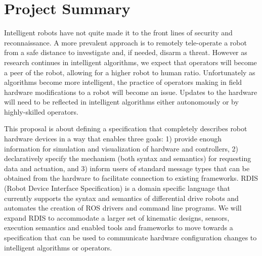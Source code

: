 
\section*{\vspace{-1em}\center Project Summary}

Intelligent robots have not quite made it to the front lines of security and reconnaissance.  A more prevalent approach is to remotely tele-operate a robot from a safe distance to investigate and, if needed, disarm a threat.  However as research continues in intelligent algorithms, we expect that operators will become a peer of the robot, allowing for a higher robot to human ratio.  Unfortunately as algorithms become more intelligent, the practice of operators making in field hardware modifications to a robot will become an issue.  Updates to the hardware will need to be reflected in intelligent algorithms either autonomously or by highly-skilled operators.  

This proposal is about defining a specification that completely describes robot hardware devices in a way that enables three goals: 1) provide enough information for simulation and visualization of hardware and controllers, 2) declaratively specify the mechanism (both syntax and semantics) for requesting data and actuation, and 3) inform users of standard message types that can be obtained from the hardware to facilitate connection to existing frameworks.  RDIS (Robot Device Interface Specification) is a domain specific language that currently supports the syntax and semantics of differential drive robots and automates the creation of ROS drivers and command line programs.  We will expand RDIS to accommodate a larger set of kinematic designs, sensors, execution semantics and enabled tools and frameworks to move towards a specification that can be used to communicate hardware configuration changes to intelligent algorithms or operators. 

%
%  

